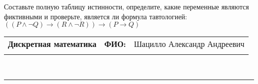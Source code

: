 \documentclass[10pt]{exam}
\newcommand{\class}{Дискретная математика}
\newcommand{\examdate}{}
\begin{document}
\begin{questions}
\begin{enumerate} [a)]
\end{enumerate}\question Составьте полную таблицу истинности, определите, какие переменные являются фиктивными и проверьте, является ли формула тавтологией:
$(( P \land \neg Q) \rightarrow (R \land \neg R)) \rightarrow (P \rightarrow Q)$

\end{questions}
\newpage
\begin{flushright}
\begin{tabular}{p{2.8in} r l}
\textbf{\class} & \textbf{ФИО:} &Шацилло Александр Андреевич
\\

\textbf{\examdate} &&\\
\end{tabular}\\
\end{flushright}
\rule[1ex]{\textwidth}{.1pt}
\end{document}
